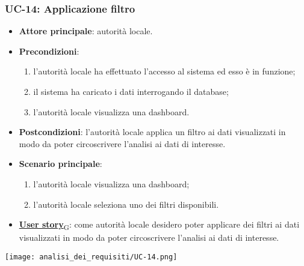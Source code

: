 \subsubsection{UC-14: Applicazione filtro}
\begin{itemize}
	\item \textbf{Attore principale}: autorità locale.
	\item \textbf{Precondizioni}:
	      \begin{enumerate}
		      \item l'autorità locale ha effettuato l'accesso al sistema ed esso è in funzione;
		      \item il sistema ha caricato i dati interrogando il database;
		      \item l'autorità locale visualizza una dashboard.
	      \end{enumerate}
	\item \textbf{Postcondizioni}: l'autorità locale applica un filtro ai dati visualizzati in modo da poter circoscrivere l'analisi ai dati di interesse.
	\item \textbf{Scenario principale}:
	      \begin{enumerate}
		      \item l'autorità locale visualizza una dashboard;
		      \item l'autorità locale seleziona uno dei filtri disponibili.
	      \end{enumerate}
	\item \href{https://7last.github.io/docs/rtb/documentazione-interna/glossario\#user-story}{\textbf{User story}\textsubscript{G}}:
	      come autorità locale desidero poter applicare dei filtri ai dati visualizzati in modo da poter circoscrivere l'analisi ai dati di interesse.
\end{itemize}
\begin{center}
	\texttt{[image: analisi\_dei\_requisiti/UC-14.png]}
\end{center}

